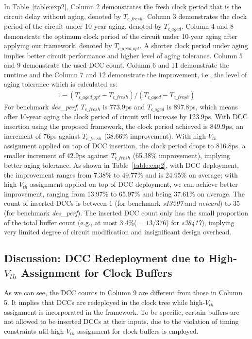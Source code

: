 In Table~\ref{table:exp2}, Column 2  demonstrates the fresh clock period that is the circuit delay without aging, denoted by $T_{c\_fresh}$. Column 3 demonstrates the clock period of the circuit under 10-year aging, denoted by $T_{c\_aged}$. Column 4 and 8 demonstrate the optimum clock period of the circuit under 10-year aging after applying our framework, denoted by $T_{c\_aged\_opt}$. A shorter clock period under aging implies better circuit performance and higher level of aging tolerance. Column 5 and 9 demonstrate the used DCC count. Column 6 and 11 demonstrate the runtime and the Column 7 and 12 demonstrate the improvement, i.e., the level of aging tolerance which is calculated as:
\begin{gather*}
1 - (T_{c\_aged\_opt} - T_{c\_fresh}) / (T_{c\_aged} - T_{c\_fresh})
\end{gather*}
For benchmark \textit{des\_perf}, $T_{c\_fresh}$ is 773.9ps and $T_{c\_aged}$ is 897.8ps, which means after 10-year aging the clock period of circuit will increase by 123.9ps. With DCC insertion using the proposed framework, the clock period achieved is 849.9ps, an increment of 76ps against $T_{c\_fresh}$ (38.66\% improvement). With high-$V_{th}$ assignment applied on top of DCC insertion, the clock period drops to 816.8ps, a smaller increment of 42.9ps against $T_{c\_fresh}$ (65.38\% improvement), implying better aging tolerance. As shown in Table~\ref{table:exp2}, with DCC deployment, the improvement ranges from 7.38\% to 49.77\% and is 24.95\% on average; with high-$V_{th}$ assignment applied on top of DCC deployment, we can achieve better improvement, ranging from 13.97\% to 65.97\% and being 37.61\% on average. The count of inserted DCCs is between 1 (for benchmark \textit{s13207} and \textit{netcard}) to 35 (for benchmark \textit{des\_perf}). The inserted DCC count only has the small proportion of the total buffer count (e.g., at most 3.4\%($= 13/376$) for \textit{s38417}), implying very limited degree of circuit modification and insignificant design overhead. 

\subsection{Discussion: DCC Redeployment due to High-$V_{th}$ Assignment for Clock Buffers}
As we can see, the DCC counts in Column 9 are different from those in Column 5. It implies that DCCs are redeployed in the clock tree while high-$V_{th}$ assignment is incorporated in the framework. To be specific, certain buffers are not allowed to be inserted DCCs at their inputs, due to the violation of timing constraints util high-$V_{th}$ assignment for clock buffers is employed.

